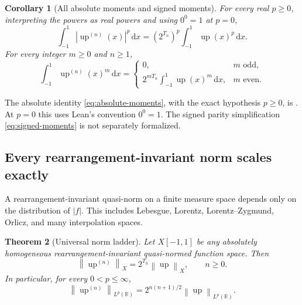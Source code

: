 \documentclass[11pt,oneside]{article}
\numberwithin{equation}{section}
\theoremstyle{plain}
\newtheorem{theorem}{Theorem}[section]
\newtheorem{corollary}[theorem]{Corollary}
\theoremstyle{definition}
\theoremstyle{remark}
\newcommand{\R}{\mathbb R}
\newcommand{\Up}{\operatorname{up}}
\newcommand{\dd}{\,\mathrm d}
\newcommand{\abs}[1]{\left|#1\right|}
\newcommand{\norm}[1]{\left\lVert#1\right\rVert}
\begin{document}
\begin{corollary}[All absolute moments and signed moments]
\label{cor:all-value-moments}
For every real $p\geq0$, interpreting the powers as real powers and using \(0^0=1\) at
\(p=0\),
\begin{equation}
 \int_{-1}^{1}\abs{\Up^{(n)}(x)}^p\dd x
 =\left(2^{T_n}\right)^p\int_{-1}^{1}\Up(x)^p\dd x.
 \label{eq:absolute-moments}
\end{equation}
For every integer $m\geq0$ and $n\geq1$,
\begin{equation}
 \int_{-1}^{1}\Up^{(n)}(x)^m\dd x
 =\begin{cases}
  0,&m\text{ odd},\\
  2^{mT_n}\displaystyle\int_{-1}^{1}\Up(x)^m\dd x,&m\text{ even}.
 \end{cases}
 \label{eq:signed-moments}
\end{equation}
\end{corollary}

The absolute identity \eqref{eq:absolute-moments}, with the exact hypothesis \(p\ge0\), is
.  At \(p=0\) this uses Lean's
 convention \(0^0=1\).  The signed parity simplification
\eqref{eq:signed-moments} is not separately formalized.

\subsection{Every rearrangement-invariant norm scales exactly}

A rearrangement-invariant quasi-norm on a finite measure space depends only on the
distribution of $|f|$.  This includes Lebesgue, Lorentz, Lorentz--Zygmund, Orlicz, and many
interpolation spaces.

\begin{theorem}[Universal norm ladder]
\label{thm:universal-norm-ladder}
Let $X[-1,1]$ be any absolutely homogeneous rearrangement-invariant quasi-normed function
space.  Then
\begin{equation}
 \boxed{
 \norm{\Up^{(n)}}_X=2^{T_n}\norm{\Up}_X,
 \qquad n\geq0.}
 \label{eq:RI-norm-law}
\end{equation}
In particular, for every $0<p\leq\infty$,
\begin{equation}
 \boxed{
 \norm{\Up^{(n)}}_{L^p(\R)}
 =2^{n(n+1)/2}\norm{\Up}_{L^p(\R)}.}
 \label{eq:Lp-norm-law}
\end{equation}
\end{theorem}
\end{document}
